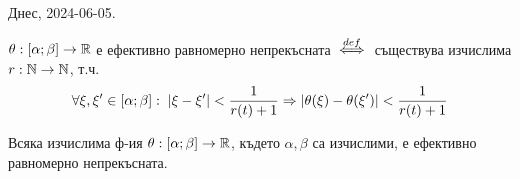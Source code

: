 \section{}
Днес, 2024-06-05.

\begin{definition}
    $\theta : [\alpha; \beta] \to {\mathbb{R}}$ е ефективно равномерно непрекъсната ${\overset{def}{\iff}}$ съществува изчислима $r : {\mathbb{N}} \to {\mathbb{N}}$, т.ч.
    \begin{equation}
        \forall \xi, \xi' \in [\alpha; \beta]:\; \left|\xi - \xi'\right| < \frac{1}{r(t) + 1} \Rightarrow \left|\theta(\xi) - \theta(\xi')\right| < \frac{1}{r(t) + 1}
    \end{equation}
\end{definition}

\begin{theorem}
    Всяка изчислима ф-ия $\theta : [\alpha; \beta] \to {\mathbb{R}}$, където $\alpha, \beta$ са изчислими, е ефективно равномерно непрекъсната.
\end{theorem}
